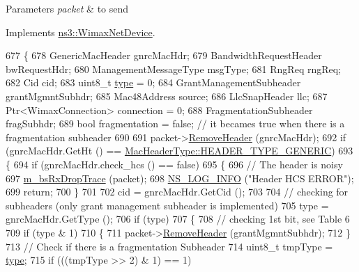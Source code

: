 \begin{DoxyParams}{Parameters}
{\em packet} & to send \\
\hline
\end{DoxyParams}


Implements \hyperlink{classns3_1_1WimaxNetDevice_a9c27ed8c265ca1516ee289c6a02a75fa}{ns3\+::\+Wimax\+Net\+Device}.


\begin{DoxyCode}
677 \{
678   GenericMacHeader gnrcMacHdr;
679   BandwidthRequestHeader bwRequestHdr;
680   ManagementMessageType msgType;
681   RngReq rngReq;
682   Cid cid;
683   uint8\_t \hyperlink{visualizer-ideas_8txt_add98db9e15e2a58cf2b57623e7aa893a}{type} = 0;
684   GrantManagementSubheader grantMgmntSubhdr;
685   Mac48Address source;
686   LlcSnapHeader llc;
687   Ptr<WimaxConnection> connection = 0;
688   FragmentationSubheader fragSubhdr;
689   \textcolor{keywordtype}{bool} fragmentation = \textcolor{keyword}{false};  \textcolor{comment}{// it becames true when there is a fragmentation subheader}
690 
691   packet->\hyperlink{classns3_1_1Packet_a0961eccf975d75f902d40956c93ba63e}{RemoveHeader} (gnrcMacHdr);
692   \textcolor{keywordflow}{if} (gnrcMacHdr.GetHt () == \hyperlink{classns3_1_1MacHeaderType_a54d8fc8bc93a2b7865627965cdd31c20a48fe5b2f20cadf78008c71469b518403}{MacHeaderType::HEADER\_TYPE\_GENERIC})
693     \{
694       \textcolor{keywordflow}{if} (gnrcMacHdr.check\_hcs () == \textcolor{keyword}{false})
695         \{
696           \textcolor{comment}{// The header is noisy}
697           \hyperlink{classns3_1_1BaseStationNetDevice_a4835b0ad2180229900fc09ae5207bd8f}{m\_bsRxDropTrace} (packet);
698           \hyperlink{group__logging_gafbd73ee2cf9f26b319f49086d8e860fb}{NS\_LOG\_INFO} (\textcolor{stringliteral}{"Header HCS ERROR"});
699           \textcolor{keywordflow}{return};
700         \}
701 
702       cid = gnrcMacHdr.GetCid ();
703 
704       \textcolor{comment}{// checking for subheaders (only grant management subheader is implemented)}
705       type = gnrcMacHdr.GetType ();
706       \textcolor{keywordflow}{if} (type)
707         \{
708           \textcolor{comment}{// checking 1st bit, see Table 6}
709           \textcolor{keywordflow}{if} (type & 1)
710             \{
711               packet->\hyperlink{classns3_1_1Packet_a0961eccf975d75f902d40956c93ba63e}{RemoveHeader} (grantMgmntSubhdr);
712             \}
713           \textcolor{comment}{// Check if there is a fragmentation Subheader}
714           uint8\_t tmpType = \hyperlink{visualizer-ideas_8txt_add98db9e15e2a58cf2b57623e7aa893a}{type};
715           \textcolor{keywordflow}{if} (((tmpType >> 2) & 1) == 1)

\end{DoxyCode}
